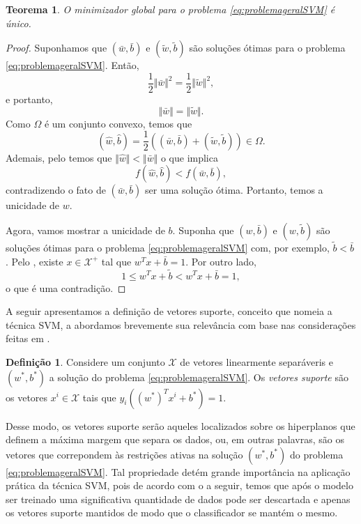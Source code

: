 \documentclass[12pt,a4paper]{scrartcl}
\def\Xset{\mathcal{X}}
\newtheorem{teo}{Teorema}
\theoremstyle{definition}%
\newtheorem{defi}{Definição}
\begin{document}
\begin{teo}
O minimizador global para o problema \eqref{eq:problemageralSVM} é único.
\end{teo}
\begin{proof}
Suponhamos que $(\bar{w}, \bar{b})$ e $(\tilde{w}, \tilde{b})$ são soluções ótimas para o problema \eqref{eq:problemageralSVM}. Então, 
\[
\dfrac{1}{2}\Vert \bar{w} \Vert^{2} = \dfrac{1}{2}\Vert \tilde{w} \Vert^{2},
\]
e portanto, 
\[
\Vert \bar{w} \Vert = \Vert \tilde{w} \Vert .
\]
Como $\Omega$ é um conjunto convexo, temos que
\[
(\hat{w}, \hat{b}) = \dfrac{1}{2}((\bar{w}, \bar{b}) + (\tilde{w}, \tilde{b})) \in \Omega .
\]
Ademais, pelo  temos que $\Vert \hat{w} \Vert < \Vert \bar{w} \Vert$ o que implica 
\[
f(\hat{w}, \hat{b}) < f(\bar{w}, \bar{b}),
\]
contradizendo o fato de $(\bar{w}, \bar{b})$ ser uma solução ótima. Portanto, temos a unicidade de $w$.

Agora, vamos mostrar a unicidade de $b$. Suponha que $(w, \bar{b})$ e $(w, \tilde{b})$ são soluções ótimas para o problema \eqref{eq:problemageralSVM} com, por exemplo, $\tilde{b} < \bar{b}$. Pelo , existe $x \in \Xset^{+}$ tal que $w^{T}x + \bar{b} = 1$. Por outro lado, 
\[
1 \leq w^{T}x + \tilde{b} < w^{T}x + \bar{b} = 1,
\]
o que é uma contradição.
\end{proof}

A seguir apresentamos a definição de vetores suporte, conceito que nomeia a técnica SVM, a abordamos brevemente sua relevância com base nas considerações feitas em \cite{Evelin2017,bishop2016pattern}.

\begin{defi} \label{defi:vetores_suporte}
Considere um conjunto $\Xset$ de vetores linearmente separáveris e $(w^{*}, b^{*})$ a solução do problema \eqref{eq:problemageralSVM}. Os \emph{vetores suporte} são os vetores $x^{i} \in \Xset$ tais que $y_{i}((w^{*})^{T} x^{i} + b^{*}) = 1$.
\end{defi}

Desse modo, os vetores suporte serão aqueles localizados sobre os hiperplanos que definem a máxima margem que separa os dados, ou, em outras palavras, são os vetores que correpondem às restrições ativas na solução $(w^{*}, b^{*})$ do problema \eqref{eq:problemageralSVM}. Tal propriedade detém grande importância na aplicação prática da técnica SVM, pois de acordo com o  a seguir, temos que após o modelo ser treinado uma significativa quantidade de dados pode ser descartada e apenas os vetores suporte mantidos de modo que o classificador se mantém o mesmo. 
\end{document}
